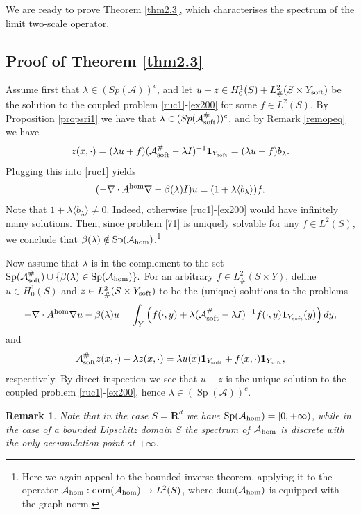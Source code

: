 \documentclass[11pt]{article}
\renewcommand{\b}{\beta}
\newcommand\soft{{\rm soft}}
\def\AA{\mathcal{A}}
\def\l{\lambda}
\def\hom{{\rm hom}}
\def\dom{{\rm dom}}
\DeclareMathOperator{\Sp}{Sp}
\newcommand\A{\mathcal A}
\def\b{\beta}
\newtheorem{remark}[theorem]{Remark}
\theoremstyle{remark}
\begin{document}
We are ready to prove Theorem \ref{thm2.3}, which characterises the spectrum of the limit two-scale operator.
\subsection{Proof of Theorem \ref{thm2.3}}
Assume first that $\l \in (Sp(\AA))^c$,  and let $u+z \in H^1_0(S)+ L^2_\#(S\times Y_\soft)$ be the solution to the coupled problem \eqref{ruc1}-\eqref{ex200} for some $f\in L^2(S)$. By Proposition \ref{propsri1} we have that   $\l \in (Sp(\AA_\soft^\# ))^c$, and by Remark \ref{remopeq} we have
$$ z(x,\cdot)=(\lambda u+f)(\AA_\soft^\# -\l I)^{-1}  \mathbf{1}_{Y_\soft} = (\lambda u+f) b_\l. $$
Plugging this into \eqref{ruc1} yields
\begin{equation}\label{71}
	(-\nabla \cdot A^{\rm hom} \nabla -\beta(\l)I) u= (1+ \l  \langle b_\l \rangle) f.
\end{equation}
Note that  $1+\l \langle b_\l \rangle \neq 0$. Indeed, otherwise \eqref{ruc1}-\eqref{ex200} would have infinitely many solutions.
Then, since problem \eqref{71} is uniquely solvable for any $f \in L^2(S)$, we conclude that $\beta(\l) \notin \Sp (\A_\hom)$.\footnote{Here we again appeal to the bounded inverse theorem, applying it to the operator $\A_\hom: \dom(\A_\hom) \to L^2(S)$, where $\dom(\A_\hom)$ is equipped with the graph norm.}

Now assume that $\l$ is in the complement to the set $\Sp  (\AA_\soft^\# ) \cup \{\beta(\l) \in \Sp (\AA_\hom)\}.$
For an arbitrary $f  \in L^2_\#(S \times Y)$, define $u\in H^1_0(S)$ and $z\in L^2_\#(S\times Y_\soft)$ to be the (unique) solutions to the problems
\begin{equation*} %
	-\nabla  \cdot A^{\rm hom} \nabla u-\b(\l)u=\int_Y \Big( f(\cdot,y) +\l 	(\AA_\soft^\# -\l I)^{-1} f(\cdot,y)\mathbf{1}_{Y_\soft}(y) \Big)\,dy,
\end{equation*} 	
and
\begin{equation*} %
\AA_\soft^\#  z(x,\cdot) -\l z(x,\cdot)= \lambda u(x)  \mathbf{1}_{Y_\soft}	 + f(x,\cdot)\mathbf{1}_{Y_\soft},
\end{equation*} 	
respectively. By direct inspection we see that $u+z$ is the unique solution to the coupled problem \eqref{ruc1}-\eqref{ex200}, hence $\l \in (\Sp (\A))^c$.

	
\begin{remark}
Note that in the case  $S=\mathbf{R}^d$ we have $\Sp (\A_\hom)=[0,+\infty)$, while in the case of a bounded Lipschitz domain $S$  the spectrum of  $\A_\hom$ is discrete with the only accumulation point at  $+\infty$.
\end{remark} 	
\end{document}
